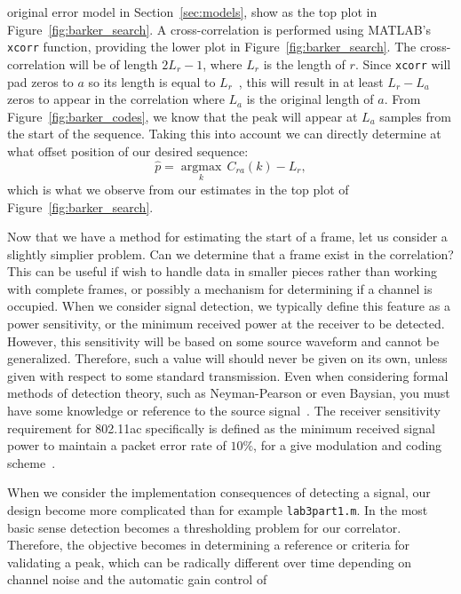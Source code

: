 \documentclass[letterpaper,12pt]{article}
\newcommand{\argmax}[1]{\operatorname*{argmax}_{#1}}
\begin{document}
original error model in Section~\ref{sec:models}, show as the top plot in Figure~\ref{fig:barker_search}.  A 
cross-correlation is performed using MATLAB\textregistered's \texttt{xcorr} function, providing the lower plot 
in Figure~\ref{fig:barker_search}.  The cross-correlation will be of length $2L_r-1$, where $L_r$ is the 
length of $r$. Since \texttt{xcorr} will pad zeros to $a$ so its length is equal to $L_r$~\cite{xcorr}, this 
will result in at least $L_r-L_a$ zeros to appear in the correlation where $L_a$ is the original length of 
$a$.  From Figure~\ref{fig:barker_codes}, we know that the peak will appear at $L_a$ samples from the start 
of the sequence.  Taking this into account we can directly determine at what offset position of our desired 
sequence:
%
\begin{equation}
 \hat{p} = \argmax{k}\,C_{ra}(k) - L_r,
\end{equation}
%
which is what we observe from our estimates in the top plot of Figure~\ref{fig:barker_search}.\par
%
Now that we have a method for estimating the start of a frame, let us consider a slightly simplier problem. 
Can we determine that a frame exist in the correlation?  This can be useful if wish to handle data in smaller 
pieces rather than working with complete frames, or possibly a mechanism for determining if a channel is 
occupied.  When we consider signal detection, we typically define this feature as a power sensitivity, or 
the minimum received power at the receiver to be detected.  However, this sensitivity will be based on some 
source waveform and cannot be generalized.  Therefore, such a value will should never be given on its own, 
unless given with respect to some standard transmission.  Even when considering formal methods of detection 
theory, such as Neyman-Pearson or even Baysian, you must have some knowledge or reference to the source 
signal~\cite{kay1998fundamentals}.  The receiver sensitivity requirement for 802.11ac specifically is defined as 
the minimum received signal power to maintain a packet error rate of $10\%$, for a give modulation and coding 
scheme~\cite{ieee80211ac}.\par
%
When we consider the implementation consequences of detecting a signal, our design become more complicated 
than for example \texttt{lab3part1.m}.  In the most basic sense detection becomes a thresholding problem for 
our correlator.  Therefore, the objective becomes in determining a reference or criteria for validating a 
peak, which can be radically different over time depending on channel noise and the automatic gain control of 
\end{document}
